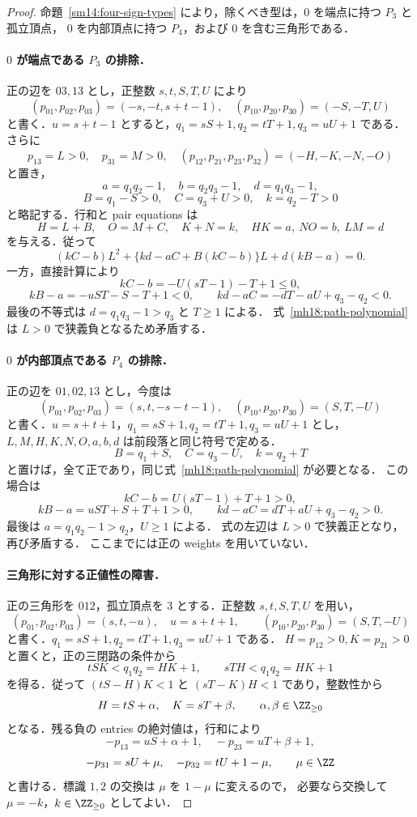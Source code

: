 \begin{proof}
命題~\ref{sm14:four-sign-types} により，除くべき型は，$0$ を端点に持つ $P_3$ と孤立頂点，
$0$ を内部頂点に持つ $P_4$，および $0$ を含む三角形である．

\paragraph{$0$ が端点である $P_3$ の排除．}
正の辺を $03,13$ とし，正整数 $s,t,S,T,U$ により
\[
 (p_{01},p_{02},p_{03})=(-s,-t,s+t-1),\quad
 (p_{10},p_{20},p_{30})=(-S,-T,U)
\]
と書く．$u=s+t-1$ とすると，$q_1=sS+1,q_2=tT+1,q_3=uU+1$ である．
さらに
\[
 p_{13}=L>0,\quad p_{31}=M>0,\quad
 (p_{12},p_{21},p_{23},p_{32})=(-H,-K,-N,-O)
\]
と置き，
\[
 a=q_1q_2-1,\quad b=q_2q_3-1,\quad d=q_1q_3-1,
\]
\[
 B=q_1-S>0,\quad C=q_3+U>0,\quad k=q_2-T>0
\]
と略記する．行和と pair equations は
\[
 H=L+B,\quad O=M+C,\quad K+N=k,\quad
 HK=a,\ NO=b,\ LM=d
\]
を与える．従って
\begin{equation}\label{mh18:path-polynomial}
 (kC-b)L^2+\{kd-aC+B(kC-b)\}L+d(kB-a)=0.
\end{equation}
一方，直接計算により
\[
 kC-b=-U(sT-1)-T+1\le0,
\]
\[
 kB-a=-uST-S-T+1<0,\qquad
 kd-aC=-dT-aU+q_3-q_2<0.
\]
最後の不等式は $d=q_1q_3-1>q_3$ と $T\ge1$ による．
式~\eqref{mh18:path-polynomial} は $L>0$ で狭義負となるため矛盾する．

\paragraph{$0$ が内部頂点である $P_4$ の排除．}
正の辺を $01,02,13$ とし，今度は
\[
 (p_{01},p_{02},p_{03})=(s,t,-s-t-1),\quad
 (p_{10},p_{20},p_{30})=(S,T,-U)
\]
と書く．$u=s+t+1$，$q_1=sS+1,q_2=tT+1,q_3=uU+1$ とし，
$L,M,H,K,N,O,a,b,d$ は前段落と同じ符号で定める．
\[
 B=q_1+S,\quad C=q_3-U,\quad k=q_2+T
\]
と置けば，全て正であり，同じ式~\eqref{mh18:path-polynomial} が必要となる．
この場合は
\[
 kC-b=U(sT-1)+T+1>0,
\]
\[
 kB-a=uST+S+T+1>0,\qquad
 kd-aC=dT+aU+q_3-q_2>0.
\]
最後は $a=q_1q_2-1>q_2$，$U\ge1$ による．
式の左辺は $L>0$ で狭義正となり，再び矛盾する．
ここまでには正の weights を用いていない．

\paragraph{三角形に対する正値性の障害．}
正の三角形を $012$，孤立頂点を $3$ とする．正整数 $s,t,S,T,U$ を用い，
\[
 (p_{01},p_{02},p_{03})=(s,t,-u),\quad u=s+t+1,
 \qquad(p_{10},p_{20},p_{30})=(S,T,-U)
\]
と書く．$q_1=sS+1,q_2=tT+1,q_3=uU+1$ である．
$H=p_{12}>0,K=p_{21}>0$ と置くと，正の三閉路の条件から
\[
 tSK<q_1q_2=HK+1,\qquad sTH<q_1q_2=HK+1
\]
を得る．従って $(tS-H)K<1$ と $(sT-K)H<1$ であり，整数性から
\begin{equation}\label{mh18:triangle-alpha-beta}
 H=tS+\alpha,\quad K=sT+\beta,\qquad \alpha,\beta\in\ZZ_{\ge0}
\end{equation}
となる．残る負の entries の絶対値は，行和により
\[
 -p_{13}=uS+\alpha+1,\quad -p_{23}=uT+\beta+1,
\]
\[
 -p_{31}=sU+\mu,\quad -p_{32}=tU+1-\mu,\qquad \mu\in\ZZ
\]
と書ける．標識 $1,2$ の交換は $\mu$ を $1-\mu$ に変えるので，
必要なら交換して $\mu=-k$，$k\in\ZZ_{\ge0}$ としてよい．


\end{proof}
